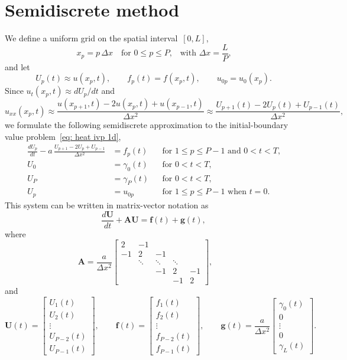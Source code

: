 \section{Semidiscrete method}

We define a uniform grid on the spatial interval~$[0,L]$,
\[
x_p=p\,\Delta x\quad\text{for $0\le p\le P$,}
	\quad\text{with $\Delta x=\frac{L}{P}$,}
\]
and let
\[
U_p(t)\approx u(x_p,t),\qquad f_p(t)=f(x_p,t),\qquad u_{0p}=u_0(x_p).
\]
Since $u_t(x_p,t)\approx dU_p/dt$ and
\[
u_{xx}(x_p,t)\approx\frac{u(x_{p+1},t)-2u(x_p,t)+u(x_{p-1},t)}{\Delta x^2}
	\approx\frac{U_{p+1}(t)-2U_p(t)+U_{p-1}(t)}{\Delta x^2},
\]
we formulate the following semidiscrete approximation to the initial-boundary 
value problem~\eqref{eq: heat ivp 1d},
\begin{equation}\label{eq: semidiscrete heat 1d}
\begin{aligned}
\frac{dU_p}{dt}-a\,\frac{U_{p+1}-2U_p+U_{p-1}}{\Delta x^2}&=f_p(t)&
	&\text{for $1\le p\le P-1$ and $0<t<T$,}\\
U_0&=\gamma_0(t)&&\text{for $0<t<T$,}\\
U_P&=\gamma_P(t)&&\text{for $0<t<T$,}\\
U_p&=u_{0p}&&\text{for $1\le p\le P-1$ when $t=0$.}
\end{aligned}
\end{equation}
This system can be written in matrix-vector notation as
\begin{equation}\label{eq: ODE system}
\frac{d\boldsymbol{U}}{dt}+\boldsymbol{A}\boldsymbol{U}=\boldsymbol{f}(t)
	+\boldsymbol{g}(t),
\end{equation}
where
\[
\boldsymbol{A}=\frac{a}{\Delta x^2}\begin{bmatrix}
 2&    -1&      &      &\\
-1&     2&    -1&      &\\
  &\ddots&\ddots&\ddots&\\
  &      &    -1&     2&-1\\
  &      &      &    -1& 2\end{bmatrix},\qquad
\]
and
\begin{equation}\label{eq: U f g semidiscrete 1d}
\boldsymbol{U}(t)=\begin{bmatrix}
U_1(t)\\ U_2(t)\\ \vdots\\ U_{P-2}(t)\\ U_{P-1}(t)\end{bmatrix},\qquad
\boldsymbol{f}(t)=\begin{bmatrix}
f_1(t)\\ f_2(t)\\ \vdots\\ f_{P-2}(t)\\ f_{P-1}(t)\end{bmatrix},\qquad
\boldsymbol{g}(t)=\frac{a}{\Delta x^2}\begin{bmatrix}
\gamma_0(t)\\ 0\\ \vdots\\ 0\\ \gamma_L(t)\end{bmatrix}.
\end{equation}
